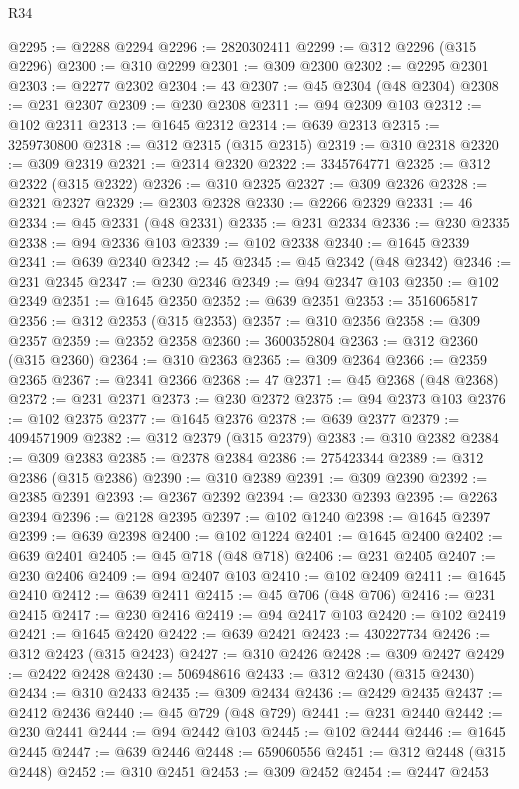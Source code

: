 \begin{lexlean}{R34}
\begin{coremodule}
@2295 := @2288 @2294
@2296 := 2820302411
@2299 := @312 @2296 (@315 @2296)
@2300 := @310 @2299
@2301 := @309 @2300
@2302 := @2295 @2301
@2303 := @2277 @2302
@2304 := 43
@2307 := @45 @2304 (@48 @2304)
@2308 := @231 @2307
@2309 := @230 @2308
@2311 := @94 @2309 @103
@2312 := @102 @2311
@2313 := @1645 @2312
@2314 := @639 @2313
@2315 := 3259730800
@2318 := @312 @2315 (@315 @2315)
@2319 := @310 @2318
@2320 := @309 @2319
@2321 := @2314 @2320
@2322 := 3345764771
@2325 := @312 @2322 (@315 @2322)
@2326 := @310 @2325
@2327 := @309 @2326
@2328 := @2321 @2327
@2329 := @2303 @2328
@2330 := @2266 @2329
@2331 := 46
@2334 := @45 @2331 (@48 @2331)
@2335 := @231 @2334
@2336 := @230 @2335
@2338 := @94 @2336 @103
@2339 := @102 @2338
@2340 := @1645 @2339
@2341 := @639 @2340
@2342 := 45
@2345 := @45 @2342 (@48 @2342)
@2346 := @231 @2345
@2347 := @230 @2346
@2349 := @94 @2347 @103
@2350 := @102 @2349
@2351 := @1645 @2350
@2352 := @639 @2351
@2353 := 3516065817
@2356 := @312 @2353 (@315 @2353)
@2357 := @310 @2356
@2358 := @309 @2357
@2359 := @2352 @2358
@2360 := 3600352804
@2363 := @312 @2360 (@315 @2360)
@2364 := @310 @2363
@2365 := @309 @2364
@2366 := @2359 @2365
@2367 := @2341 @2366
@2368 := 47
@2371 := @45 @2368 (@48 @2368)
@2372 := @231 @2371
@2373 := @230 @2372
@2375 := @94 @2373 @103
@2376 := @102 @2375
@2377 := @1645 @2376
@2378 := @639 @2377
@2379 := 4094571909
@2382 := @312 @2379 (@315 @2379)
@2383 := @310 @2382
@2384 := @309 @2383
@2385 := @2378 @2384
@2386 := 275423344
@2389 := @312 @2386 (@315 @2386)
@2390 := @310 @2389
@2391 := @309 @2390
@2392 := @2385 @2391
@2393 := @2367 @2392
@2394 := @2330 @2393
@2395 := @2263 @2394
@2396 := @2128 @2395
@2397 := @102 @1240
@2398 := @1645 @2397
@2399 := @639 @2398
@2400 := @102 @1224
@2401 := @1645 @2400
@2402 := @639 @2401
@2405 := @45 @718 (@48 @718)
@2406 := @231 @2405
@2407 := @230 @2406
@2409 := @94 @2407 @103
@2410 := @102 @2409
@2411 := @1645 @2410
@2412 := @639 @2411
@2415 := @45 @706 (@48 @706)
@2416 := @231 @2415
@2417 := @230 @2416
@2419 := @94 @2417 @103
@2420 := @102 @2419
@2421 := @1645 @2420
@2422 := @639 @2421
@2423 := 430227734
@2426 := @312 @2423 (@315 @2423)
@2427 := @310 @2426
@2428 := @309 @2427
@2429 := @2422 @2428
@2430 := 506948616
@2433 := @312 @2430 (@315 @2430)
@2434 := @310 @2433
@2435 := @309 @2434
@2436 := @2429 @2435
@2437 := @2412 @2436
@2440 := @45 @729 (@48 @729)
@2441 := @231 @2440
@2442 := @230 @2441
@2444 := @94 @2442 @103
@2445 := @102 @2444
@2446 := @1645 @2445
@2447 := @639 @2446
@2448 := 659060556
@2451 := @312 @2448 (@315 @2448)
@2452 := @310 @2451
@2453 := @309 @2452
@2454 := @2447 @2453

\end{coremodule}
\end{lexlean}
